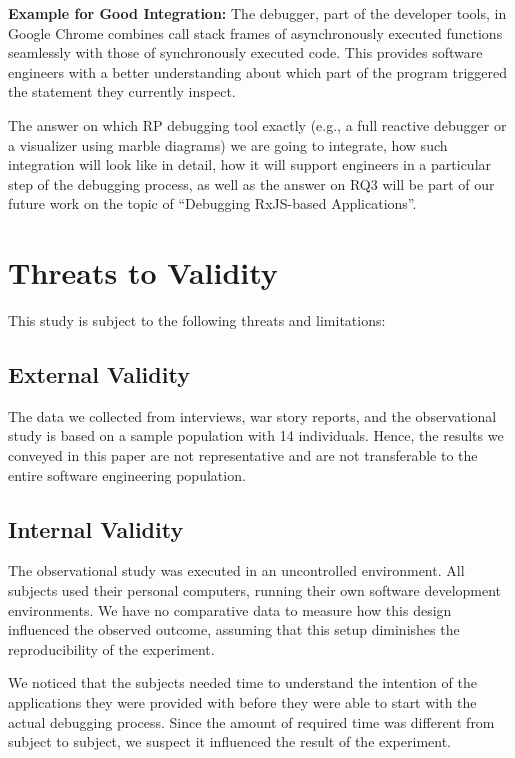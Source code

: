 \documentclass[sigplan,screen,review]{acmart}
\begin{document}
\begin{tcolorbox}[colback=white,boxrule=1pt,sharp corners=all,left=1.8mm,boxsep=1mm]
	\textbf{Example for Good Integration:} The debugger, part of the developer tools, in Google Chrome combines call stack frames of asynchronously executed functions\cite{chromeasync} seamlessly with those of synchronously executed code. This provides software engineers with a better understanding about which part of the program triggered the statement they currently inspect.
\end{tcolorbox}

The answer on which RP debugging tool exactly (e.g., a full reactive debugger or a visualizer using marble diagrams) we are going to integrate, how such integration will look like in detail, how it will support engineers in a particular step of the debugging process, as well as the answer on RQ3 will be part of our future work on the topic of ``Debugging RxJS-based Applications''.


\section{Threats to Validity}
\label{sec:threats}

This study is subject to the following threats and limitations:

\subsection{External Validity}

The data we collected from interviews, war story reports, and the observational study is based on a sample population with 14 individuals. Hence, the results we conveyed in this paper are not representative and are not transferable to the entire software engineering population.

\subsection{Internal Validity}

The observational study was executed in an uncontrolled environment. All subjects used their personal computers, running their own software development environments. We have no comparative data to measure how this design influenced the observed outcome, assuming that this setup diminishes the reproducibility of the experiment.

We noticed that the subjects needed time to understand the intention of the applications they were provided with before they were able to start with the actual debugging process. Since the amount of required time was different from subject to subject, we suspect it influenced the result of the experiment.
\end{document}
